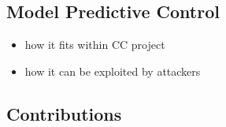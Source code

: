 \subsection{Model Predictive Control}
\label{sec:model-predictive-control}

\begin{itemize}
	\item how it fits within CC project
	\item how it can be exploited by attackers
\end{itemize}

\subsection{Contributions}
\label{sec:contributions}